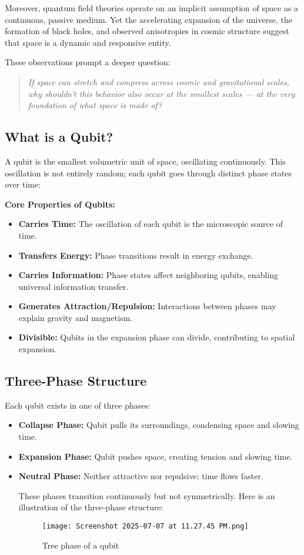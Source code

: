 \documentclass[12pt]{report} %
\begin{document}
Moreover, quantum field theories operate on an implicit assumption of space as a continuous, passive medium. Yet the accelerating expansion of the universe, the formation of black holes, and observed anisotropies in cosmic structure suggest that space is a dynamic and responsive entity.

These observations prompt a deeper question:  
\begin{quote}
\emph{If space can stretch and compress across cosmic and gravitational scales, why shouldn’t this behavior also occur at the smallest scales — at the very foundation of what space is made of?}
\end{quote}

\subsection{What is a Qubit?}

A qubit is the smallest volumetric unit of space, oscillating continuously. This oscillation is not entirely random; each qubit goes through distinct phase states over time:

\textbf{Core Properties of Qubits:}
\begin{itemize}
\item \textbf{Carries Time:} The oscillation of each qubit is the microscopic source of time.
\item \textbf{Transfers Energy:} Phase transitions result in energy exchange.
\item \textbf{Carries Information:} Phase states affect neighboring qubits, enabling universal information transfer.
\item \textbf{Generates Attraction/Repulsion:} Interactions between phases may explain gravity and magnetism.
\item \textbf{Divisible:} Qubits in the expansion phase can divide, contributing to spatial expansion.
\end{itemize}

\subsection{Three-Phase Structure}

Each qubit exists in one of three phases:

\begin{itemize}
\item \textbf{Collapse Phase:} Qubit pulls its surroundings, condensing space and slowing time.
\item \textbf{Expansion Phase:} Qubit pushes space, creating tension and slowing time.
\item \textbf{Neutral Phase:} Neither attractive nor repulsive; time flows faster.

These phases transition continuously but not symmetrically. Here is an illustration of the three-phase structure:
\begin{figure}[H]
    \centering
    \texttt{[image: Screenshot 2025-07-07 at 11.27.45 PM.png]}
    \caption{Tree phase of a qubit}
    \label{fig:enter-label}
\end{figure}
\end{itemize}
\end{document}
